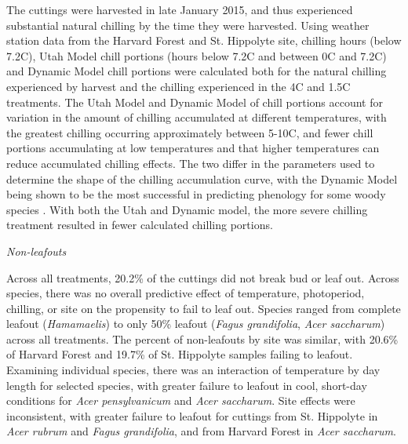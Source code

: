 \documentclass{article}
\begin{document}
\noindent The cuttings were harvested in late January 2015, and thus experienced substantial natural chilling by the time they were harvested. Using weather station data from the Harvard Forest and St. Hippolyte site, chilling hours (below 7.2\degree C), Utah Model chill portions (hours below 7.2\degree C and between 0\degree C and 7.2\degree C) and Dynamic Model \citep{Erez:1988} chill portions were calculated both for the natural chilling experienced by harvest and the chilling experienced in the 4\degree C and 1.5\degree C treatments. The Utah Model and Dynamic Model of chill portions account for variation in the amount of chilling accumulated at different temperatures, with the greatest chilling occurring approximately between 5-10\degree C, and fewer chill portions accumulating at low temperatures and that higher temperatures can reduce accumulated chilling effects. The two differ in the parameters used to determine the shape of the chilling accumulation curve, with the Dynamic Model being shown to be the most successful in predicting phenology for some woody species \citep{Luedeling:2009}.
With both the Utah and Dynamic model, the more severe chilling treatment resulted in fewer calculated chilling portions. 

\noindent\emph{Non-leafouts}

\noindent Across all treatments, 20.2\% of the cuttings did not break bud or leaf out. Across species, there was no overall predictive effect of temperature, photoperiod, chilling, or site on the propensity to fail to leaf out. Species ranged from complete leafout (\emph{Hamamaelis}) to only 50\% leafout (\emph{Fagus grandifolia}, \emph{Acer saccharum}) across all treatments. The percent of non-leafouts by site was similar, with 20.6\% of Harvard Forest and 19.7\% of St. Hippolyte samples failing to leafout. Examining individual species,  there was an interaction of temperature by day length for selected species, with greater failure to leafout in cool, short-day conditions for \emph{Acer pensylvanicum}  and \emph{Acer saccharum}. Site effects were inconsistent, with greater failure to leafout for cuttings from St. Hippolyte in \emph{Acer rubrum} and \emph{Fagus grandifolia}, and from Harvard Forest in \emph{Acer saccharum}. 


\end{document}
